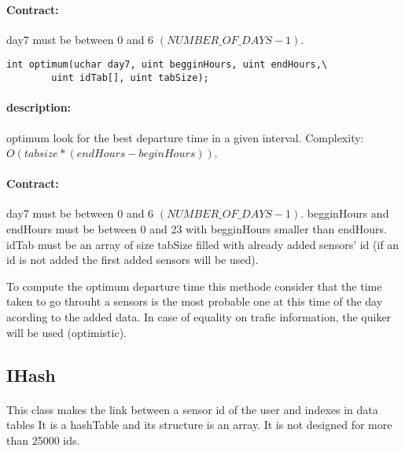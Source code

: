 \documentclass[a4paper, 12pts]{article}
\begin{document}
\paragraph{Contract:}
	day7 must be between 0 and 6 $(NUMBER\_OF\_DAYS-1)$.
		
\begin{lstlisting}
int optimum(uchar day7, uint begginHours, uint endHours,\
		uint idTab[], uint tabSize);
\end{lstlisting}
\paragraph{description:}
	optimum look for the best departure time in a given interval. Complexity: $O(tabsize * (endHours-beginHours) )$.
\paragraph{Contract:}
	day7 must be between 0 and 6 $(NUMBER\_OF\_DAYS-1)$. begginHours and endHours must be between 0 and 23 with begginHours smaller than endHours. idTab must be an array of size tabSize filled with already added sensors' id (if an id is not added the first added sensors will be used).
	
	To compute the optimum departure time this methode consider that the time taken to go throuht a sensors is the most probable one at this time of the day acording to the added data. In case of equality on trafic information, the quiker will be used (optimistic).

\subsection{IHash}

\paragraph{}
This class makes the link between a sensor id of the user and indexes in data tables
It is a hashTable and its structure is an array.
It is not designed for more than 25000 ids.

\end{document}
